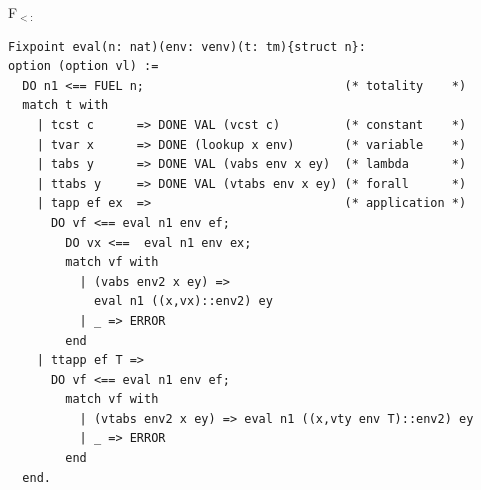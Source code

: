 \documentclass{beamer}
\begin{document}
\begin{frame}[fragile]{F$_{<:}$}
\begin{lstlisting}[keywords={}]
Fixpoint eval(n: nat)(env: venv)(t: tm){struct n}: 
option (option vl) :=
  DO n1 <== FUEL n;                            (* totality    *)
  match t with
    | tcst c      => DONE VAL (vcst c)         (* constant    *)
    | tvar x      => DONE (lookup x env)       (* variable    *)
    | tabs y      => DONE VAL (vabs env x ey)  (* lambda      *)
    | ttabs y     => DONE VAL (vtabs env x ey) (* forall      *)
    | tapp ef ex  =>                           (* application *)
      DO vf <== eval n1 env ef;
        DO vx <==  eval n1 env ex;
        match vf with
          | (vabs env2 x ey) =>
            eval n1 ((x,vx)::env2) ey
          | _ => ERROR
        end
    | ttapp ef T =>
      DO vf <== eval n1 env ef;
        match vf with
          | (vtabs env2 x ey) => eval n1 ((x,vty env T)::env2) ey
          | _ => ERROR
        end
  end.
\end{lstlisting}
\end{frame}
\end{document}
